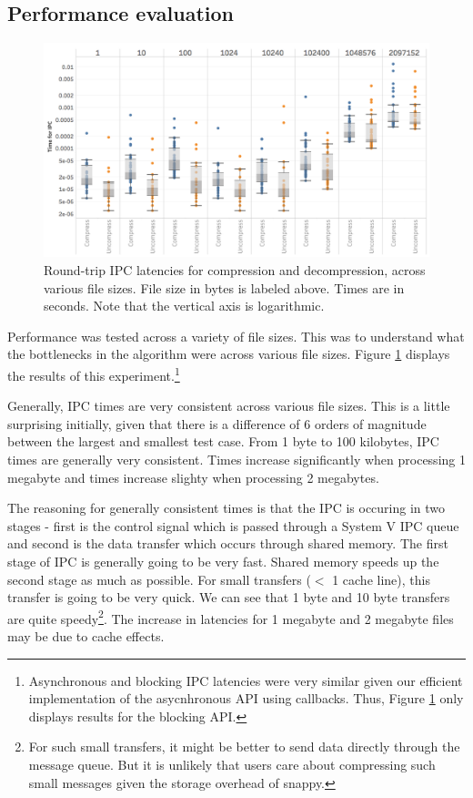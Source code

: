 \documentclass[paper=a4,fontsize=11pt]{report} %
\numberwithin{equation}{section} %
\numberwithin{figure}{section} %
\numberwithin{table}{section} %
\begin{document}
\subsection{Performance evaluation}

\begin{figure}[htb!]
  \includegraphics[width=\linewidth]{img/IPCTime.png}
  \caption{Round-trip IPC latencies for compression and decompression, across various file sizes. File size in bytes is labeled above. Times are in seconds. Note that the vertical axis is logarithmic.}
  \label{ipc_time_chart}
\end{figure}

Performance was tested across a variety of file sizes. This was to understand what the bottlenecks in the algorithm were across various file sizes. Figure \ref{ipc_time_chart} displays the results of this experiment.\footnote{Asynchronous and blocking IPC latencies were very similar given our efficient implementation of the asycnhronous API using callbacks. Thus, Figure \ref{ipc_time_chart} only displays results for the blocking API.}

Generally, IPC times are very consistent across various file sizes. This is a little surprising initially, given that there is a difference of 6 orders of magnitude between the largest and smallest test case. From 1 byte to 100 kilobytes, IPC times are generally very consistent. Times increase significantly when processing 1 megabyte and times increase slighty when processing 2 megabytes.

The reasoning for generally consistent times is that the IPC is occuring in two stages - first is the control signal which is passed through a System V IPC queue and second is the data transfer which occurs through shared memory. The first stage of IPC is generally going to be very fast. Shared memory speeds up the second stage as much as possible. For small transfers ($<$ 1 cache line), this transfer is going to be very quick. We can see that 1 byte and 10 byte transfers are quite speedy\footnote{For such small transfers, it might be better to send data directly through the message queue. But it is unlikely that users care about compressing such small messages given the storage overhead of snappy.}. The increase in latencies for 1 megabyte and 2 megabyte files may be due to cache effects.
\end{document}
